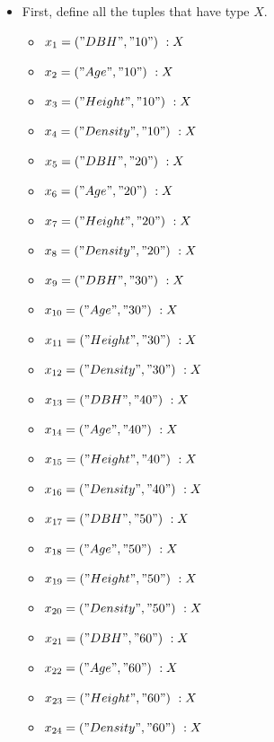 \documentclass[12pt, titlepage]{article}
\begin{document}
\begin{itemize}
    \item 
First, define all the tuples that have type $X$.
\begin{itemize}
    \item $x_1 = ("DBH", "10")\ :X$
    \item $x_2 = ("Age", "10")\ :X$
    \item $x_3 = ("Height", "10")\ :X$
    \item $x_4 = ("Density", "10")\ :X$
    \vspace{0.5cm}

    \item $x_5 = ("DBH", "20")\ :X$
    \item $x_6 = ("Age", "20")\ :X$
    \item $x_7 = ("Height", "20")\ :X$
    \item $x_8 = ("Density", "20")\ :X$
    \vspace{0.5cm}
    
    \item $x_9 = ("DBH", "30")\ :X$
    \item $x_{10} = ("Age", "30")\ :X$
    \item $x_{11} = ("Height", "30")\ :X$
    \item $x_{12} = ("Density", "30")\ :X$
    \vspace{0.5cm}
    
    \renewcommand{\attr}{40}
    \item $x_{13} = ("DBH", "\attr")\ :X$
    \item $x_{14} = ("Age", "\attr")\ :X$
    \item $x_{15} = ("Height", "\attr")\ :X$
    \item $x_{16} = ("Density", "\attr")\ :X$
    \vspace{0.5cm}

    \renewcommand{\attr}{50}
    \item $x_{17} = ("DBH", "\attr")\ :X$
    \item $x_{18} = ("Age", "\attr")\ :X$
    \item $x_{19} = ("Height", "\attr")\ :X$
    \item $x_{20} = ("Density", "\attr")\ :X$
    \vspace{0.5cm}

    \renewcommand{\attr}{60}
    \item $x_{21} = ("DBH", "\attr")\ :X$
    \item $x_{22} = ("Age", "\attr")\ :X$
    \item $x_{23} = ("Height", "\attr")\ :X$
    \item $x_{24} = ("Density", "\attr")\ :X$
    \vspace{0.5cm}


\end{itemize}
\end{itemize}
\end{document}
